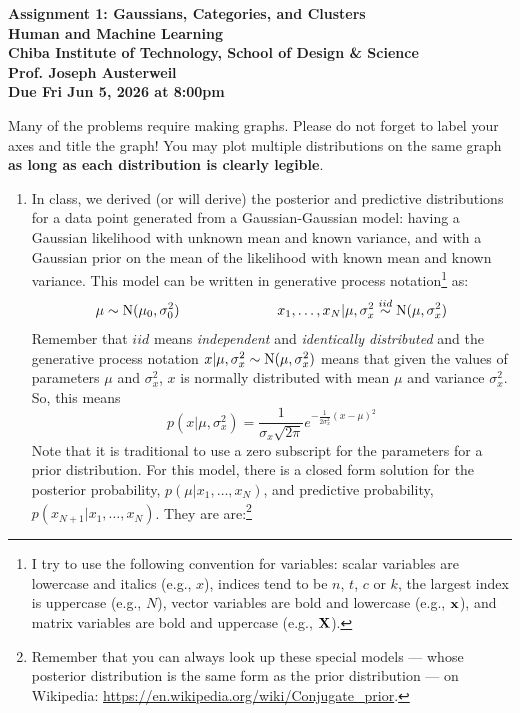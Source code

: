 \documentclass[11pt]{article}
\begin{document}
\begin{centering}
{\large \bf Assignment 1: Gaussians, Categories, and Clusters \\ Human and Machine Learning \\ Chiba Institute of Technology, School of Design \& Science \\ Prof. Joseph Austerweil \\ Due Fri Jun 5, 2026 at 8:00pm \\ }
\end{centering}

\noindent Many of the problems require making graphs. Please do not forget to label your axes and title the graph! You may plot multiple distributions on the same graph {\bf as long as each distribution is clearly legible}.
\begin{enumerate}
\item[1. Gaussians:] In class, we derived (or will derive) the posterior and predictive distributions for a data point generated from a Gaussian-Gaussian model: having a Gaussian likelihood with unknown mean and known variance, and with a Gaussian prior on the mean of the likelihood with known mean and known variance. This model can be written in generative process notation\footnote{I try to use the following convention for variables: scalar variables are lowercase and italics (e.g., $x$), indices tend to be $n$, $t$, $c$ or $k$, the largest index is uppercase (e.g., $N$), vector variables are bold and lowercase (e.g., ${\bf x}$), and matrix variables are bold and uppercase (e.g., ${\bf X}$).} as:
\begin{align*}
\mu \sim {\rm N}(\mu_0, \sigma^2_0)   & \qquad \qquad \qquad & x_1,\dotsc, x_N | \mu, \sigma_x^2 \overset{iid}{\sim} {\rm N}(\mu, \sigma^2_x)
\end{align*}
Remember that $iid$ means {\em independent} and {\em identically distributed} and the generative process notation $x | \mu, \sigma_x^2 \sim {\rm N}(\mu, \sigma_x^2)$ means that given the values of parameters $\mu$ and $\sigma_x^2$, $x$ is normally distributed with mean $\mu$ and variance $\sigma_x^2$. So, this means
\begin{equation*}
p(x|\mu,\sigma_x^2) = \frac{1}{\sigma_x \sqrt{2 \pi}} e^{-\frac{1}{2 \sigma_x^2}\left(x-\mu \right)^2}
\end{equation*} 
Note that it is traditional to use a zero subscript for the parameters for a prior distribution. For this model, there is a closed form solution for the posterior probability, $p(\mu | x_1, \dotsc, x_N)$, and predictive probability, $p(x_{N+1} | x_1,\dotsc,x_N)$. They are  are:\footnote{Remember that you can always look up these special models --- whose posterior distribution is the same form as the prior distribution --- on Wikipedia: \url{https://en.wikipedia.org/wiki/Conjugate_prior}.}

\end{enumerate}
\end{document}
